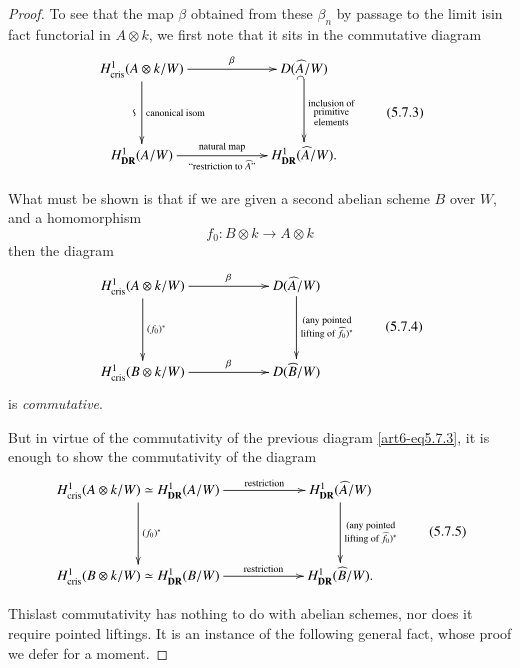 \begin{proof}
To see that the map $\beta$ obtained from these $\beta_{n}$ by passage to the limit is\pageoriginale in fact functorial in $A\otimes k$, we first note that it sits in the commutative diagram
\begin{equation*}
\vcenter{
\xymatrix@C=2cm@R=1.5cm{
H^{1}_{\text{cris}}(A\otimes k/W)\ar[d]_-{\rotatebox{90}{$\backsim$}}^-{\text{canonical isom}}\ar[r]^-{\beta} & D(\widehat{A}/W)\ar@{_(->}[d]^{\substack{\text{inclusion of}\\ \text{primitive}\\ \text{elements}}}\\
H^{1}_{\DR}(A/W)\ar[r]^-{\text{natural map}}_-{\text{``restriction to $\widehat{A}$''}} & H^{1}_{\DR}(\widehat{A}/W).
}}\tag{5.7.3}\label{art6-eq5.7.3}
\end{equation*}

What must be shown is that if we are given a second abelian scheme $B$ over $W$, and a homomorphism
$$
f_{0}:B\otimes k\to A\otimes k
$$
then the diagram
\begin{equation*}
\vcenter{
\xymatrix@C=2cm@R=1.5cm{
H^{1}_{\text{cris}}(A\otimes k/W) \ar[r]^-{\beta} \ar[d]^-{(f_{0})^{*}} & D(\widehat{A}/W)\ar[d]^-{\substack{\text{(any pointed}\\ \text{lifting of $\widehat{f}_{0}$)$^{*}$}}}\\
H^{1}_{\text{cris}}(B\otimes k/W)\ar[r]^-{\beta} & D(\widehat{B}/W)
}}\tag{5.7.4}\label{art6-eq5.7.4}
\end{equation*}
is {\em commutative}.

But in virtue of the commutativity of the previous diagram \eqref{art6-eq5.7.3}, it is enough to show the commutativity of the diagram
\begin{equation*}
\vcenter{
\xymatrix@C=2cm@R=1.5cm{
H^{1}_{\text{cris}}(A\otimes k/W)\simeq H^{1}_{\DR}(A/W) \ar[r]^-{\text{restriction}} \ar[d]^-{(f_{0})^{*}} & H^{1}_{\DR}(\widehat{A}/W)\ar[d]^-{\substack{\text{(any pointed}\\ \text{lifting of $\widehat{f}_{0}$)$^{*}$}}}\\
H^{1}_{\text{cris}}(B\otimes k/W)\simeq H^{1}_{\DR}(B/W) \ar[r]^-{\text{restriction}} & H^{1}_{\DR}(\widehat{B}/W).
}}\tag{5.7.5}\label{art6-eq5.7.5}
\end{equation*}

This\pageoriginale last commutativity has nothing to do with abelian schemes, nor does it require pointed liftings. It is an instance of the following general fact, whose proof we defer for a moment.


\end{proof}
